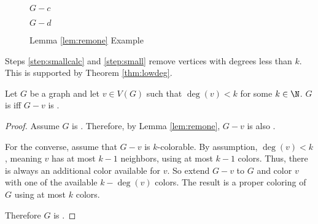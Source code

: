 \begin{figure}[h]
\begin{minipage}{1.25in}
\begin{center}
      \(G-c\)
    \end{center}
  \end{minipage}
  \begin{minipage}{1.25in}
    \begin{center}

      \bigskip

      \(G-d\)
    \end{center}
  \end{minipage}
  \caption{Lemma \ref{lem:remone} Example}
\end{figure}

Steps \ref{step:smallcalc} and \ref{step:small} remove vertices with degrees less than \(k\).  This is supported by
Theorem \ref{thm:lowdeg}.

\begin{theorem}
  \label{thm:lowdeg}
  Let \(G\) be a graph and let \(v\in V(G)\) such that \(\deg(v)<k\) for some \(k\in\N\).  \(G\) is  iff
  \(G-v\) is .
\end{theorem}

\begin{proof}
  Assume \(G\) is .  Therefore, by Lemma \ref{lem:remone}, \(G-v\) is also .

  For the converse, assume that \(G-v\) is \(k\)-colorable.  By assumption, \(\deg(v)<k\), meaning \(v\) has at
  most \(k-1\) neighbors, using at most \(k-1\) colors.  Thus, there is always an additional color available for
  \(v\).  So extend \(G-v\) to \(G\) and color \(v\) with one of the available \(k-\deg(v)\) colors.  The result is
  a proper coloring of \(G\) using at most \(k\) colors.

  Therefore \(G\) is .
\end{proof}

